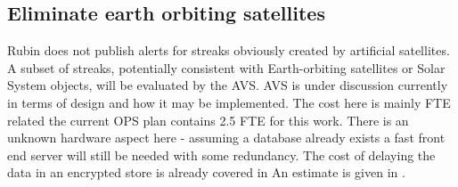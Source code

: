 
\subsection{Eliminate earth orbiting satellites} \label{sec:4eliminate}

Rubin does not publish alerts for streaks obviously created by artificial satellites.
A subset of streaks, potentially consistent with Earth-orbiting satellites or Solar System objects, will be evaluated by the AVS.
AVS is under discussion currently in terms of design and how it may be implemented.
The cost here is mainly FTE related the current OPS plan contains 2.5 FTE for this work.
There is an unknown hardware aspect here - assuming a database already exists a fast front end server will still be needed with
some redundancy.
The cost of delaying the data in an encrypted store is already covered in 
An estimate is given in .




